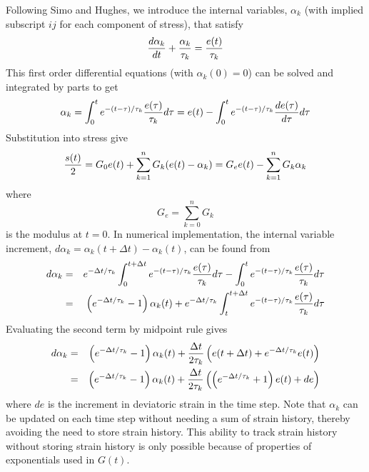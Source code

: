 \documentclass[11pt]{book}
\begin{document}
Following Simo and Hughes, we introduce the internal variables, $\alpha_k$ (with implied subscript $ij$ for each component of stress), that satisfy
\begin{equation}
       {d\alpha_k\over dt} + {\alpha_k\over \tau_k} = {e(t)\over \tau_k}
\end{equation}
This first order differential equations (with $\alpha_k(0)=0$) can be solved and integrated by parts to get
\begin{equation}
      \alpha_k = \int_0^t e^{-(t-\tau)/\tau_k} {e(\tau)\over \tau_k}d\tau = e(t) - \int_0^t e^{-(t-\tau)/\tau_k} {de(\tau)\over d\tau}d\tau
\end{equation}
Substitution into stress give
\begin{equation}
     {s(t)\over2} = G_0 e(t) + \sum_{k=1}^n G_k (e(t) - \alpha_k )= G_e e(t) -  \sum_{k=1}^n G_k \alpha_k
\end{equation}
where
\begin{equation}
     G_e = \sum_{k=0}^n G_k
\end{equation}
is the modulus at $t=0$. In numerical implementation, the internal variable increment, $d\alpha_k = \alpha_k(t+\Delta t)-\alpha_k(t)$, can be found from
\begin{eqnarray}
      d\alpha_k  & = & e^{-\Delta t/\tau_k} \int_0^{t+\Delta t} e^{-(t-\tau)/\tau_k} {e(\tau)\over \tau_k}d\tau -  \int_0^t e^{-(t-\tau)/\tau_k} {e(\tau)\over \tau_k}d\tau \\
      & = & \left(e^{-\Delta t/\tau_k}-1\right)\alpha_k(t) + e^{-\Delta t/\tau_k} \int_t^{t+\Delta t} e^{-(t-\tau)/\tau_k} {e(\tau)\over \tau_k}d\tau 
\end{eqnarray}
Evaluating the second term by midpoint rule gives
\begin{eqnarray}
    d\alpha_k & = & \left(e^{-\Delta t/\tau_k}-1\right)\alpha_k(t) +  {\Delta t\over 2\tau_k}\left(e(t+\Delta t) +e^{-\Delta t/\tau_k}e(t)\right) \\
         & = & \left(e^{-\Delta t/\tau_k}-1\right)\alpha_k(t) +  {\Delta t\over 2\tau_k}\left(\left(e^{-\Delta t/\tau_k}+1\right)e(t) + de\right) 
\end{eqnarray}
where $de$ is the increment in deviatoric strain in the time step. Note that $\alpha_k$ can be updated on each time step without needing a sum of strain history, thereby avoiding the need to store strain history. This ability to track strain history without storing strain history is only possible because of properties of exponentials used in $G(t)$.
\end{document}

